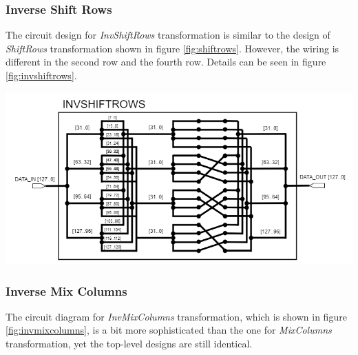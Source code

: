 \documentclass[a4paper, 10pt]{article}
\newenvironment{Figure}
    {\par\medskip\noindent\minipage{\linewidth}}
    {\endminipage\par\medskip}
\begin{document}
\begin{multicols}{2}
            \subsubsection{Inverse Shift Rows}

             The circuit design for \textit{InvShiftRows} transformation is similar to the design of \textit{ShiftRows} transformation shown in figure \ref{fig:shiftrows}. However, the wiring is different in the second row and the fourth row. Details can be seen in figure \ref{fig:invshiftrows}.

	\noindent
            \begin{Figure}
                \centering
                \includegraphics[width=\linewidth]{InvShiftRows.png}
                \label{fig:invshiftrows}
            \end{Figure}

            \subsubsection{Inverse Mix Columns}

            The circuit diagram for \textit{InvMixColumns} transformation, which is shown in figure \ref{fig:invmixcolumns}, is a bit more sophisticated than the one for \textit{MixColumns} transformation, yet the top-level designs are still identical.


\end{multicols}
\end{document}
